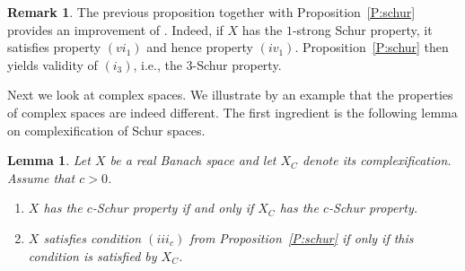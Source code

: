 \documentclass{amsart}
\numberwithin{equation}{section}
\newtheorem{lemma}[thm]{Lemma}
\theoremstyle{definition}
\newtheorem{remark}[thm]{Remark}
\begin{document}
\begin{remark}
 The previous proposition together with Proposition~\ref{P:schur} provides an improvement of \cite[Proposition 4.1]{qschur}. Indeed, if $X$ has the $1$-strong Schur property, it satisfies property $(vi_1)$ and hence property $(iv_1)$. Proposition~\ref{P:schur} then yields validity of $(i_3)$, i.e., the $3$-Schur property.
\end{remark}

Next we look at complex spaces. We illustrate by an example that the properties of complex spaces are indeed different. The first ingredient is the following lemma on complexification of Schur spaces.
    
\begin{lemma}\label{L:komplexifikace}
    Let $X$ be a real Banach space and let $X_C$ denote its complexification. Assume that $c>0$.
    \begin{enumerate}[$(a)$]
        \item $X$ has the $c$-Schur property if and only if $X_C$ has the $c$-Schur property.
        \item $X$ satisfies condition $(iii_c)$ from Proposition~\ref{P:schur} if only if this condition is satisfied by $X_C$.
    \end{enumerate}
\end{lemma}
\end{document}
